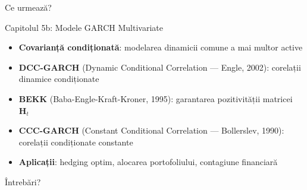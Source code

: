 \documentclass[9pt, aspectratio=169, t]{beamer}
\begin{document}
\begin{frame}{Ce urmează?}
    \small
        \begin{center}
        \begin{minipage}{0.85\textwidth}
        \begin{block}{Capitolul 5b: Modele GARCH Multivariate}
            \begin{itemize}
                \item \textbf{Covarianță condiționată}: modelarea dinamicii comune a mai multor active
                \item \textbf{DCC-GARCH} (Dynamic Conditional Correlation --- Engle, 2002): corelații dinamice condiționate
                \item \textbf{BEKK} (Baba-Engle-Kraft-Kroner, 1995): garantarea pozitivității matricei $\mathbf{H}_t$
                \item \textbf{CCC-GARCH} (Constant Conditional Correlation --- Bollerslev, 1990): corelații condiționate constante
                \item \textbf{Aplicații}: hedging optim, alocarea portofoliului, contagiune financiară
            \end{itemize}
        \end{block}
        \end{minipage}
        \end{center}

        \vspace{0.3cm}
        \begin{center}
        \Large\textcolor{MainBlue}{Întrebări?}
        \end{center}
\end{frame}
\end{document}
